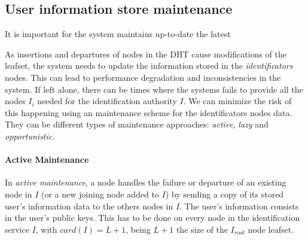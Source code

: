 
\subsection{User information store maintenance}
\label{sec:lazy_node_maintenance}

It is important for the system maintains up-to-date the latest 

As insertions and departures of nodes in the DHT cause modifications of the
leafset, the system needs to update the information stored in the
\textit{identificators} nodes. This can lead to performance degradation and inconsistencies in the
system. If left alone, there can be times where the systems
fails to provide all the nodes $I_i$ needed for the identification authority
$I$. We can minimize the risk of this happening using an maintenance scheme for
the identificators nodes data. They can be different types of maintenance approaches:
\textit{active}, \textit{lazy} and \textit{opportunistic}.

\paragraph{Active Maintenance}
  In \textit{active maintenance}, a
node handles the failure or departure of an existing node in $I$ (or a new
joining node added to $I$) by sending a copy of its stored user's
information data to the others nodes in $I$.
The user's information consists in the user's public keys. This has to be done on every node in the identification service
$I$, with $card(I) = L+1$, being $L+1$ the size of the $I_{root}$ node leafset.


